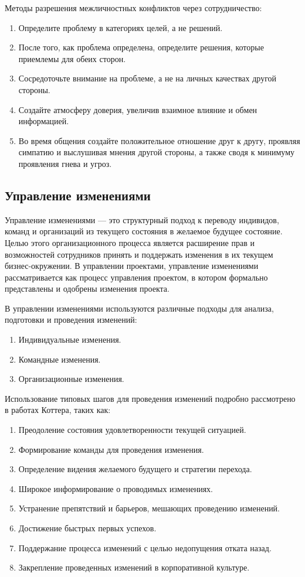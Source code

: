 \documentclass[a4paper,12pt,oneside,final]{extarticle}
\numberwithin{equation}{section}
\begin{document}
Методы разрешения межличностных конфликтов через сотрудничество:
\begin{enumerate}
	\item Определите проблему в категориях целей, а не решений.
	\item После того, как проблема определена, определите решения, которые приемлемы для обеих сторон.
	\item Сосредоточьте внимание на проблеме, а не на личных качествах другой стороны.
	\item Создайте атмосферу доверия, увеличив взаимное влияние и обмен информацией.
	\item Во время общения создайте положительное отношение друг к другу, проявляя симпатию и выслушивая мнения другой стороны, а также сводя к минимуму проявления гнева и угроз.
\end{enumerate}

\subsection{Управление изменениями}
Управление изменениями --- это структурный подход к переводу индивидов, команд и организаций из текущего состояния в желаемое будущее состояние. 
Целью этого организационного процесса является расширение прав и возможностей сотрудников принять и поддержать изменения в их текущем бизнес-окружении. 
В управлении проектами, управление изменениями рассматривается как процесс управления проектом, в котором формально представлены и одобрены изменения проекта.

В управлении изменениями используются различные подходы для анализа, подготовки и проведения изменений:
\begin{enumerate}
	\item Индивидуальные изменения.
	\item Командные изменения.
	\item Организационные изменения.
\end{enumerate}

Использование типовых шагов для проведения изменений подробно рассмотрено в работах Коттера, таких как:
\begin{enumerate}
	\item Преодоление состояния удовлетворенности текущей ситуацией.
	\item Формирование команды для проведения изменения.
	\item Определение видения желаемого будущего и стратегии перехода.
	\item Широкое информирование о проводимых изменениях.
	\item Устранение препятствий и барьеров, мешающих проведению изменений.
	\item Достижение быстрых первых успехов.
	\item Поддержание процесса изменений с целью недопущения отката назад.
	\item Закрепление проведенных изменений в корпоративной культуре.
\end{enumerate}
\end{document}
